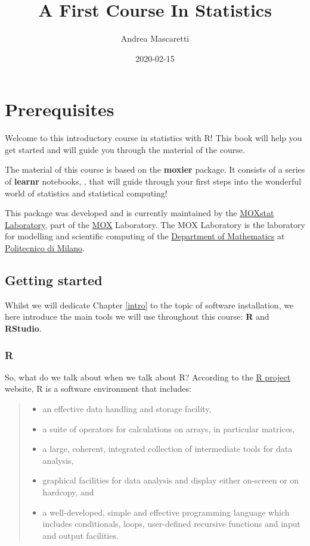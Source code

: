 \documentclass[]{book}
\title{A First Course In Statistics}
\author{Andrea Mascaretti}
\date{2020-02-15}
\providecommand{\tightlist}{%
  \setlength{\itemsep}{0pt}\setlength{\parskip}{0pt}}
\begin{document}
\maketitle

{
\setcounter{tocdepth}{1}
\tableofcontents
}
\chapter{Prerequisites}\label{prerequisites}

Welcome to this introductory course in statistics with R! This book will
help you get started and will guide you through the material of the
course.

The material of this course is based on the \textbf{moxier} package. It
consists of a series of \textbf{learnr} notebooks, \citep{R-learnr},
that will guide through your first steps into the wonderful world of
statistics and statistical computing!

This package was developed and is currently maintained by the
\href{https://statistics.mox.polimi.it/}{MOXstat Laboratory}, part of
the \href{https://mox.polimi.it/}{MOX} Laboratory. The MOX Laboratory is
the laboratory for modelling and scientific computing of the
\href{https://www.mate.polimi.it/?lg=en}{Department of Mathematics} at
\href{https://www.polimi.it}{Politecnico di Milano}.

\section{Getting started}\label{getting-started}

Whilst we will dedicate Chapter \ref{intro} to the topic of software
installation, we here introduce the main tools we will use throughout
this course: \textbf{R} and \textbf{RStudio}.

\subsection{R}\label{r}

So, what do we talk about when we talk about R? According to the
\href{https://www.r-project.org/about.html}{R project} website, R is a
software environment that includes:

\begin{quote}
\begin{itemize}
\tightlist
\item
  an effective data handling and storage facility,
\item
  a suite of operators for calculations on arrays, in particular
  matrices,
\item
  a large, coherent, integrated collection of intermediate tools for
  data analysis,
\item
  graphical facilities for data analysis and display either on-screen or
  on hardcopy, and
\item
  a well-developed, simple and effective programming language which
  includes conditionals, loops, user-defined recursive functions and
  input and output facilities.
\end{itemize}
\end{quote}
\end{document}
